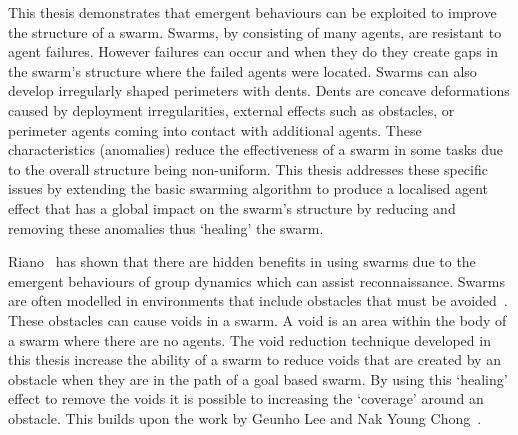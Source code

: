 
This thesis demonstrates that emergent behaviours can be exploited to improve the structure of a swarm. Swarms, by consisting of many agents, are resistant to agent failures. However failures can occur and when they do they create gaps in the swarm's structure where the failed agents were located. Swarms can also develop irregularly shaped perimeters with dents. Dents are concave deformations caused by deployment irregularities, external effects such as obstacles, or perimeter agents coming into contact with additional agents. These characteristics (anomalies) reduce the effectiveness of a swarm in some tasks due to the overall structure being non-uniform. This thesis addresses these specific issues by extending the basic swarming algorithm to produce a localised agent effect that has a global impact on the swarm's structure by reducing and removing these anomalies thus `healing' the swarm.


Riano~\cite{RM:11} has shown that there are hidden benefits in using swarms due to the emergent behaviours of group dynamics which can assist reconnaissance. Swarms are often modelled in environments that include obstacles that must be avoided~\cite{VG:05, BAB:12, TRI:15}. These obstacles can cause voids in a swarm. A void is an area within the body of a swarm where there are no agents. The void reduction technique developed in this thesis increase the ability of a swarm to reduce voids that are created by an obstacle when they are in the path of a goal based swarm. By using this `healing' effect to remove the voids it is possible to increasing the `coverage' around an obstacle. This builds upon the work by Geunho Lee and Nak Young Chong~\cite{GN:08}. 

